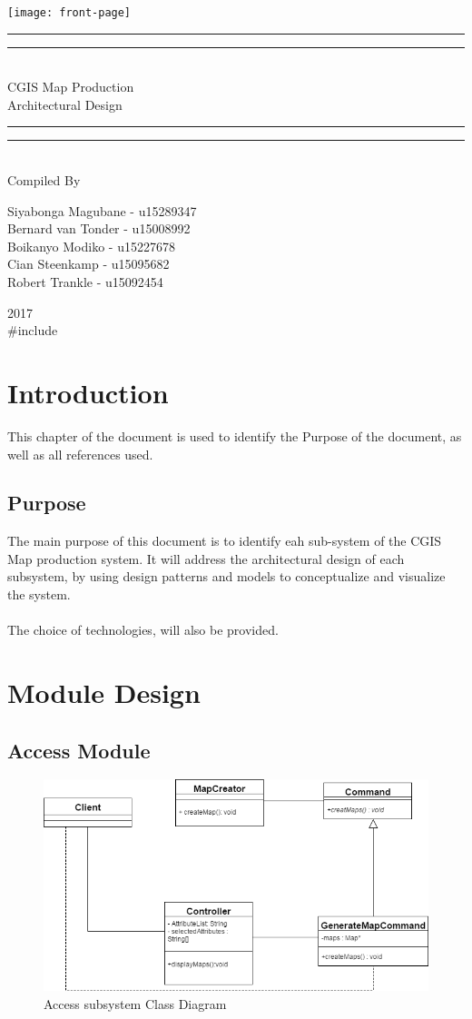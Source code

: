 \documentclass{article}
\newcommand*{\titleGP}{\begingroup
\centering 
\vspace*{\baselineskip}

\rule{\textwidth}{1.6pt}\vspace*{-\baselineskip}\vspace*{2pt}
\rule{\textwidth}{0.4pt}\\[\baselineskip]

{\LARGE CGIS Map Production\\ [0.3\baselineskip] Architectural Design} \\ [0.2\baselineskip]
\rule{\textwidth}{0.4pt}\vspace*{-\baselineskip}\vspace{3.2pt}
\rule{\textwidth}{1.6pt}\\[\baselineskip] %



Compiled By \\[\baselineskip]
{\Large Siyabonga Magubane - u15289347 \\ Bernard van Tonder -  u15008992 \\ Boikanyo Modiko - u15227678 \\ Cian Steenkamp - u15095682 \\ Robert Trankle - u15092454\par} 

\vfill

{\scshape 2017} \\[0.3\baselineskip]
{\large \#include}\par

\endgroup}
\begin{document}
	\begin{center}
		\texttt{[image: front-page]}
	\end{center}
\titleGP
\tableofcontents
\listoffigures
\newpage
\section{Introduction}
{This chapter of the document is used to identify the Purpose of the document, as well as all references used.}
	\subsection{Purpose}
    {The main purpose of this document is to identify eah sub-system of the CGIS Map production system. It will address the architectural design of each subsystem, by using design patterns and models to conceptualize and visualize the system.
    \\\\
    The choice of technologies, will also be provided.}
   
 \section{Module Design}
 	\subsection{Access Module}
       \begin{figure}[h!]
        \includegraphics[width=\textwidth]{AccessCD}
            \caption{Access subsystem Class Diagram}
        \end{figure}
        
\end{document}
